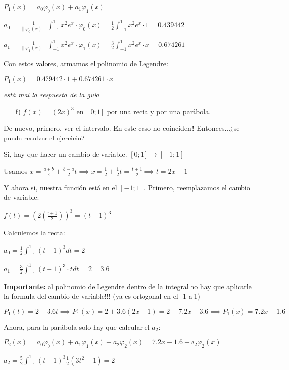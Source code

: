 \documentclass[11pt]{article}
\begin{document}
	$P_1(x)=a_0\varphi_0(x)+a_1\varphi_1(x)$
	
	$\displaystyle a_0=\frac{1}{\lVert \varphi_0(x) \rVert} \int_{-1}^{1}x^2e^x\cdot \varphi_0(x)=\frac{1}{2} \int_{-1}^{1}x^2e^x\cdot 1=0.439442$
	
	$\displaystyle a_1=\frac{1}{\lVert \varphi_1(x) \rVert} \int_{-1}^{1}x^2e^x\cdot \varphi_1(x)=\frac{3}{2} \int_{-1}^{1}x^2e^x\cdot x=0.674261$
	
	Con estos valores, armamos el polinomio de Legendre:
	
	$P_1(x)=0.439442\cdot1+0.674261\cdot x$
	
	\textit{está mal la respuesta de la guía}\\

	\begin{itemize}
		\item[f)] $f(x)=(2x)^3$ en $[0;1]$ por una recta y por una parábola.
	\end{itemize}

	De nuevo, primero, ver el intervalo. En este caso no coinciden!! Entonces...¿se puede resolver el ejercicio?
	
	Si, hay que hacer un cambio de variable. $[0;1]\rightarrow[-1;1]$
	
	Usamos $\displaystyle x=\frac{a+b}{2}+\frac{b-a}{2}t \implies x=\frac{1}{2}+\frac{1}{2}t=\frac{t+1}{2} \implies t=2x-1$
	
	Y ahora si, nuestra función está en el $[-1;1]$. Primero, reemplazamos el cambio de variable:
	
	$\displaystyle f(t)=\left(2\left(\frac{t+1}{2}\right)\right)^3=(t+1)^3$
	
	Calculemos la recta:
	
	$\displaystyle a_0=\frac{1}{2}\int_{-1}^{1}(t+1)^3dt=2$
	
	$\displaystyle a_1=\frac{3}{2}\int_{-1}^{1}(t+1)^3\cdot t dt=2=3.6$
	
	\textbf{Importante:} al polinomio de Legendre dentro de la integral no hay que aplicarle la formula del cambio de variable!!! (ya es ortogonal en el -1 a 1)
	
	$P_1(t)=2+3.6t \implies P_1(x)=2+3.6(2x-1)=2+7.2x-3.6 \implies P_1(x)=7.2x-1.6$
	
	Ahora, para la parábola solo hay que calcular el $a_2$:
	
	$P_2(x)=a_0\varphi_0(x)+a_1\varphi_1(x)+a_2\varphi_2(x)=7.2x-1.6+a_2\varphi_2(x)$
	
	$\displaystyle a_2=\frac{5}{2}\int_{-1}^{1}(t+1)^3\frac{1}{2}(3t^2-1)=2$
	
\end{document}
